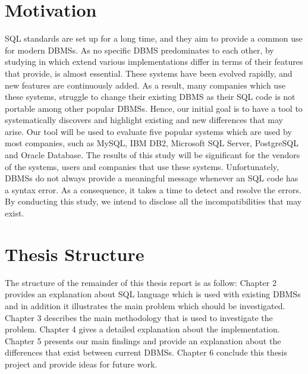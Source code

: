  \section{Motivation}
 SQL standards are set up for a long time, and they aim to provide a common use for modern DBMSs. As no specific DBMS predominates to each other, by studying in which extend various implementations differ in terms of their features that provide, is almost essential. These systems have been evolved rapidly, and new features are continuously added. As a result, many companies which use these systems, struggle to change their existing DBMS as their SQL code is not portable among other popular DBMSs. Hence, our initial goal is to have a tool to systematically discovers and highlight existing and new differences that may arise. Our tool will be used to evaluate five popular systems which are used by most companies, such as MySQL, IBM DB2, Microsoft SQL Server, PostgreSQL and Oracle Database. The results of this study will be significant for the vendors of the systems, users and companies that use these systems. Unfortunately, DBMSs do not always provide a meaningful message whenever an SQL code has a syntax error. As a consequence, it takes a time to detect and resolve the errors. By conducting this study, we intend to disclose all the incompatibilities that may exist.
 
 \section{Thesis Structure}
 The structure of the remainder of this thesis report is as follow: Chapter 2 provides an explanation about SQL language which is used with existing DBMSs and in addition it illustrates the main problem which should be investigated. Chapter 3 describes the main methodology that is used to investigate the problem. Chapter 4 gives a detailed explanation about the implementation. Chapter 5 presents our main findings and provide an explanation about the differences that exist between current DBMSs. Chapter 6 conclude this thesis project and provide ideas for future work.  

